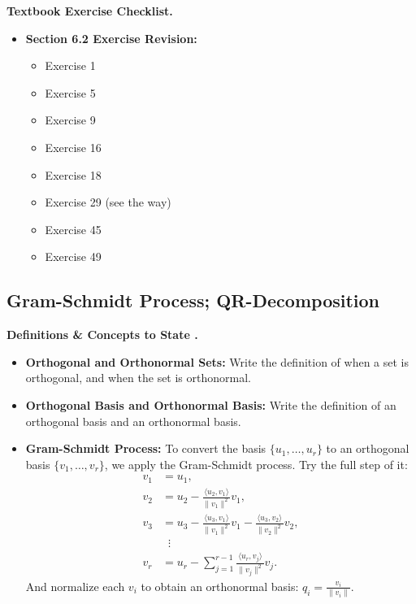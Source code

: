 \documentclass{../../../templates/natsirt}
\newcounter{topic}[section]
\newenvironment{recallbox}[1][]{%
    \begin{bluebox}[#1]\refstepcounter{topic}\textbf{Definitions \& Concepts to State \thesection.\thetopic}%
}{\end{bluebox}}
\newenvironment{reviewbox}[1][]{\begin{whitebox}[#1]\textbf{Textbook Exercise Checklist. }}{\end{whitebox}}
\newcommand{\citem}{\item[$\square$]}
\begin{document}
\begin{reviewbox}
    \begin{itemize}
        \citem \textbf{Section 6.2 Exercise Revision:}
        \begin{itemize}
            \citem Exercise 1
            \citem Exercise 5
            \citem Exercise 9
            \citem Exercise 16
            \citem Exercise 18
            \citem Exercise 29 (see the way)
            \citem Exercise 45
            \citem Exercise 49
        \end{itemize}
    \end{itemize}
\end{reviewbox}

\subsection{Gram-Schmidt Process; QR-Decomposition}

\begin{recallbox}
    \begin{itemize}
        \citem \textbf{Orthogonal and Orthonormal Sets:} Write the definition of when a set is orthogonal, and when the set is orthonormal.
        \citem \textbf{Orthogonal Basis and Orthonormal Basis:} Write the definition of an orthogonal basis and an orthonormal basis.
        \citem \textbf{Gram-Schmidt Process:} To convert the basis $\{u_1, \dots, u_r\}$ to an orthogonal basis $\{v_1, \dots, v_r\}$, we apply the Gram-Schmidt process. Try the full step of it:
        \begin{align*}
            v_1 &= u_1, \\
            v_2 &= u_2 - \frac{\langle u_2, v_1 \rangle}{\|v_1\|^2} v_1, \\
            v_3 &= u_3 - \frac{\langle u_3, v_1 \rangle}{\|v_1\|^2} v_1 - \frac{\langle u_3, v_2 \rangle}{\|v_2\|^2} v_2, \\
            &\;\;\vdots \\
            v_r &= u_r - \sum_{j=1}^{r-1} \frac{\langle u_r, v_j \rangle}{\|v_j\|^2} v_j.
        \end{align*}
        And normalize each $v_i$ to obtain an orthonormal basis: $q_i = \frac{v_i}{\|v_i\|}$.
    \end{itemize}
\end{recallbox}
\end{document}
